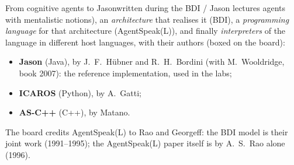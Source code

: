 \begin{nbwhiteboard}[label=wb:bdi-family]{From cognitive agents to Jason}{written during the BDI / Jason lectures}
agents with mentalistic notions), an \emph{architecture} that realises it (BDI), a
\emph{programming language} for that architecture (AgentSpeak(L)), and finally
\emph{interpreters} of the language in different host languages, with their authors (boxed
on the board):
\begin{itemize}[nosep]
  \item \textbf{Jason} (Java), by J.~F.~H\"ubner and R.~H.~Bordini (with M.~Wooldridge, book
        2007): the reference implementation, used in the labs;
  \item \textbf{ICAROS} (Python), by A.~Gatti;
  \item \textbf{AS-C++} (C++), by Matano.
\end{itemize}
The board credits AgentSpeak(L) to Rao and Georgeff: the BDI model is their joint work
(1991--1995); the AgentSpeak(L) paper itself is by A.~S.~Rao alone (1996).
\end{nbwhiteboard}
